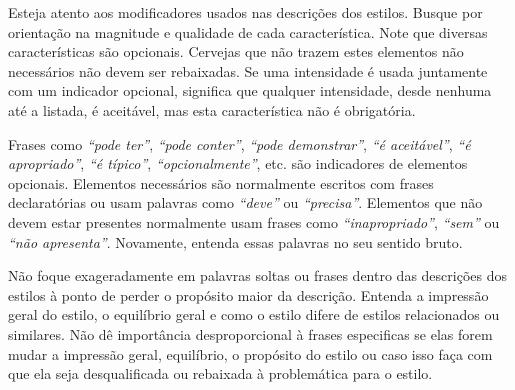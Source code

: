 Esteja atento aos modificadores usados nas descrições dos estilos. Busque por orientação na magnitude e qualidade de cada característica. Note que diversas características são opcionais. Cervejas que não trazem estes elementos não necessários não devem ser rebaixadas. Se uma intensidade é usada juntamente com um indicador opcional, significa que qualquer intensidade, desde nenhuma até a listada, é aceitável, mas esta característica não é obrigatória.

Frases como \textit{“pode ter”}, \textit{“pode conter”}, \textit{“pode demonstrar”}, \textit{“é aceitável”}, \textit{“é apropriado”}, \textit{“é típico”}, \textit{“opcionalmente”}, etc. são indicadores de elementos opcionais. Elementos necessários são normalmente escritos com frases declaratórias ou usam palavras como \textit{“deve”} ou \textit{“precisa”}. Elementos que não devem estar presentes normalmente usam frases como \textit{“inapropriado”}, \textit{“sem”} ou \textit{“não apresenta”}. Novamente, entenda essas palavras no seu sentido bruto.

Não foque exageradamente em palavras soltas ou frases dentro das descrições dos estilos à ponto de perder o propósito maior da descrição. Entenda a impressão geral do estilo, o equilíbrio geral e como o estilo difere de estilos relacionados ou similares. Não dê importância desproporcional à frases especificas se elas forem mudar a impressão geral, equilíbrio, o propósito do estilo ou caso isso faça com que ela seja desqualificada ou rebaixada à problemática para o estilo.